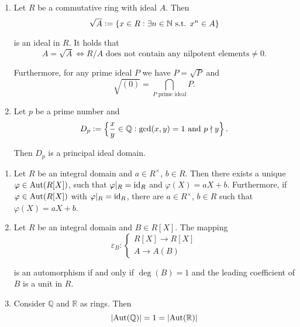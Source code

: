 \begin{example}[Rings]
\begin{enumerate}[label = \textup{(}\alph*\textup{)}]
	\item Let $R$ be a commutative ring with ideal $A$. Then 
		\begin{equation}
			\sqrt{A} := \cbr[0]{x \in R : \exists n \in \mathbb{N} \text{ s.t. } x^n \in A} 
		\end{equation}

		\noindent is an ideal in $R$. It holds that 
		\begin{equation}
			A = \sqrt{A} \Leftrightarrow R/A \text{ does not contain any nilpotent elements} \neq 0.
		\end{equation}

		Furthermore, for any prime ideal $P$ we have $P = \sqrt{P}$ and 
		\begin{equation}
			\sqrt{(0)} = \bigcap_{P \text{ prime ideal}} P.
		\end{equation}
	\item Let $p$ be a prime number and 
		\begin{equation}
			D_p := \cbr[2]{\frac{x}{y} \in \mathbb{Q}: \gcd(x,y) = 1 \text{ and } p \nmid y}.
		\end{equation}

		Then $D_p$ is a principal ideal domain.
	\end{enumerate}	
\end{example}

\begin{example}
	\mbox{}
	\begin{enumerate}[label = \textup{(}\alph*\textup{)}]
		\item Let $R$ be an integral domain and $a \in R^\times$, $b \in R$. Then there exists a unique $\varphi \in \operatorname{Aut}(R[X])$, such that $\varphi |_R = \operatorname{id}_R$ and $\varphi(X) = aX + b$. Furthermore, if $\varphi \in \operatorname{Aut}(R[X])$ with $\varphi|_R = \operatorname{id}_R$, there are $a \in R^\times$, $b \in R$ such that $\varphi(X) = aX + b$.
		\item Let $R$ be an integral domain and $B \in R[X]$. The mapping
			\begin{equation}
				\varepsilon_B:\begin{cases}
					R[X] \to R[X]\\
					A \to A(B)
				\end{cases}
			\end{equation}

			\noindent is an automorphism if and only if $\deg(B) = 1$ and the leading coefficient of $B$ is a unit in $R$.
		\item Consider $\mathbb{Q}$ and $\mathbb{R}$ as rings. Then 
	\begin{equation}
		\abs[0]{\Aut(\mathbb{Q})} = 1 = \abs[0]{\Aut(\mathbb{R})}
	\end{equation}
\end{enumerate}
\end{example}

